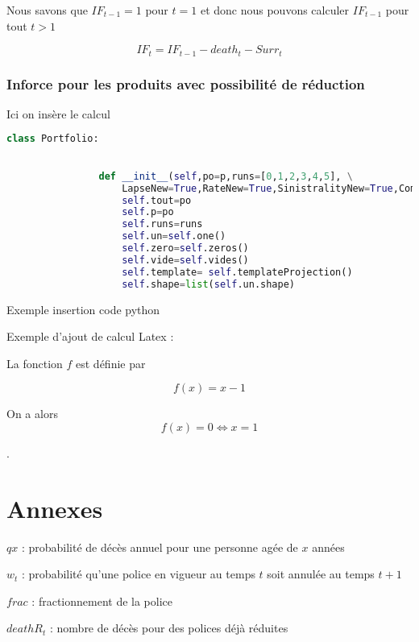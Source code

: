 \documentclass{article}
\begin{document}
\label{IF}
Nous savons que $IF_{t-1} = 1$ pour $t = 1$ et donc nous pouvons calculer $IF_{t-1}$ pour tout $t>1$ 

\begin{equation}
IF_{t} = IF_{t-1} - death_t - Surr_t
\end{equation} 

		\subsubsection{Inforce pour les produits avec possibilité de réduction}
		Ici on insère le calcul 

			\begin{lstlisting}[language=Python]
			class Portfolio:
    

    			def __init__(self,po=p,runs=[0,1,2,3,4,5], \
                    LapseNew=True,RateNew=True,SinistralityNew=True,CommissionNew=True,CostNew=True):
        			self.tout=po    
        			self.p=po
        			self.runs=runs
        			self.un=self.one()
        			self.zero=self.zeros()
        			self.vide=self.vides()
        			self.template= self.templateProjection()
        			self.shape=list(self.un.shape)

			\end{lstlisting}
			Exemple insertion code python	
			
			Exemple d'ajout de calcul Latex :

La fonction $f$ est définie par

\begin{equation}
  f(x) = x-1
\end{equation}

On a alors
\begin{equation}
   f(x) = 0 \iff x = 1
\end{equation}



\newpage. 
    
\appendix

\section{Annexes}

\noindent $qx$ : probabilité de décès annuel pour une personne agée de $x$ années

\noindent $w_t$ : probabilité qu'une police en vigueur au temps $t$ soit annulée au temps $t+1$

\noindent $frac$ : fractionnement de la police

\noindent $deathR_t$ : nombre de décès pour des polices déjà réduites

\noindent

\noindent

\noindent

\noindent

\noindent

\noindent
\end{document}
